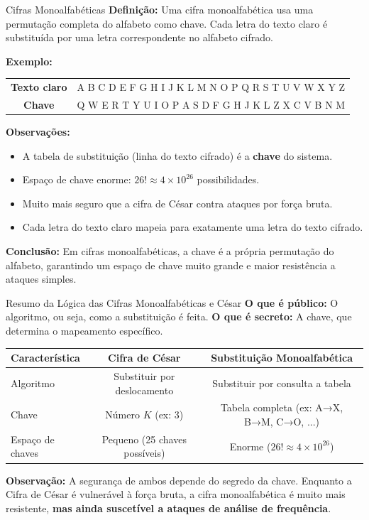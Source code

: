 \begin{frame}{Cifras Monoalfabéticas}
    \textbf{Definição:}
    Uma cifra monoalfabética usa uma permutação completa do alfabeto como chave. Cada letra do texto claro é substituída por uma letra correspondente no alfabeto cifrado.

    \medskip
    \textbf{Exemplo:}

    \begin{tabular}{c|c}
        \textbf{Texto claro} & A B C D E F G H I J K L M N O P Q R S T U V W X Y Z \\
        \textbf{Chave}       & Q W E R T Y U I O P A S D F G H J K L Z X C V B N M \\
    \end{tabular}

    \medskip
    \textbf{Observações:}
    \begin{itemize}
        \item A tabela de substituição (linha do texto cifrado) é a \textbf{chave} do sistema.
        \item Espaço de chave enorme: $26! \approx 4 \times 10^{26}$ possibilidades.
        \item Muito mais seguro que a cifra de César contra ataques por força bruta.
        \item Cada letra do texto claro mapeia para exatamente uma letra do texto cifrado.
    \end{itemize}

    \textbf{Conclusão:}
    Em cifras monoalfabéticas, a chave é a própria permutação do alfabeto, garantindo um espaço de chave muito grande e maior resistência a ataques simples.
\end{frame}

\begin{frame}{Resumo da Lógica das Cifras Monoalfabéticas e César}
    \textbf{O que é público:} O algoritmo, ou seja, como a substituição é feita.
    \textbf{O que é secreto:} A chave, que determina o mapeamento específico.

    \medskip
    \small
    \begin{tabular}{l|c|c}
        \textbf{Característica} & \textbf{Cifra de César}       & \textbf{Substituição Monoalfabética}     \\
        \hline
        Algoritmo               & Substituir por deslocamento   & Substituir por consulta a tabela         \\
        Chave                   & Número $K$ (ex: 3)            & Tabela completa (ex: A→X, B→M, C→O, ...) \\
        Espaço de chaves        & Pequeno (25 chaves possíveis) & Enorme ($26! \approx 4 \times 10^{26}$)  \\
    \end{tabular}

    \medskip
    \textbf{Observação:}
    A segurança de ambos depende do segredo da chave. Enquanto a Cifra de César é vulnerável à força bruta, a cifra monoalfabética é muito mais resistente, \textbf{mas ainda suscetível a ataques de análise de frequência}.
\end{frame}


